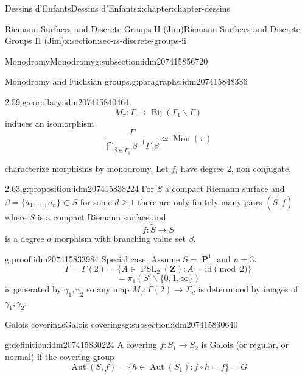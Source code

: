 \documentclass[oneside,10pt,]{book}
\numberwithin{equation}{section}
\newcommand{\inv}{^{-1}}
\newcommand{\ZZ}{\mathbf{Z}}
\newcommand{\id}{\mathrm{id}}
\DeclareMathOperator{\PP}{\mathbf{P}}
\DeclareMathOperator{\Aut}{Aut}
\DeclareMathOperator{\PSL}{PSL}
\begin{document}
\begin{chapterptx}{Dessins d'Enfants}{}{Dessins d'Enfants}{}{}{x:chapter:chapter-dessins}
\begin{sectionptx}{Riemann Surfaces and Discrete Groups II (Jim)}{}{Riemann Surfaces and Discrete Groups II (Jim)}{}{}{x:section:sec-rs-discrete-groups-ii}
\begin{subsectionptx}{Monodromy}{}{Monodromy}{}{}{g:subsection:idm207415856720}
\begin{paragraphs}{Monodromy and Fuchsian groups.}{g:paragraphs:idm207415848336}
\begin{corollary}{2.59.}{}{g:corollary:idm207415840464}%
%
\begin{equation*}
M_\pi \colon \Gamma \to \operatorname{Bij} (\Gamma_1 \backslash \Gamma)
\end{equation*}
induces an isomorphism%
\begin{equation*}
\frac{\Gamma}{\bigcap_{\beta\in \Gamma_1} \beta\inv \Gamma_1 \beta} \simeq \operatorname{Mon}(\pi)
\end{equation*}
%
\end{corollary}
characterize morphisms by monodromy. Let \(f_i\) have degree 2, non conjugate.%
\begin{proposition}{2.63.}{}{g:proposition:idm207415838224}%
For \(S\) a compact Riemann surface and \(\beta = \{ a_1, \ldots, a_n\} \subset S\) for some \(d \ge 1\) there are only finitely many pairs \((\tilde S, f)\) where \(\tilde S\) is a compact Riemann surface and%
\begin{equation*}
f\colon \tilde S \to S
\end{equation*}
is a degree \(d\) morphism with branching  value set \(\beta\).%
\end{proposition}
\begin{proofptx}{}{g:proof:idm207415833984}
Special case: Assume \(S = \PP^1\) and \(n=3\).%
\begin{equation*}
\Gamma = \Gamma(2) = \{ A \in \PSL_2(\ZZ) : A = \id \pmod 2\}
\end{equation*}
%
\begin{equation*}
= \pi_1 (S' \smallsetminus \{0,1,\infty\})
\end{equation*}
is generated by \(\gamma_1, \gamma_2\) so any map \(M_f \colon \Gamma(2) \to \Sigma_d\) is determined by  images of \(\gamma_1, \gamma_2\).%
\end{proofptx}
\end{paragraphs}%
\end{subsectionptx}
%
%
\typeout{************************************************}
\typeout{************************************************}
%
\begin{subsectionptx}{Galois coverings}{}{Galois coverings}{}{}{g:subsection:idm207415830640}
\begin{definition}{}{g:definition:idm207415830224}%
A covering \(f\colon S_1\to S_2\) is Galois (or regular, or normal) if the covering group%
\begin{equation*}
\Aut(S,f) =  \{ h\in \Aut(S_1) : f\circ h= f\} = G

\end{equation*}
\end{definition}
\end{subsectionptx}
\end{sectionptx}
\end{chapterptx}
\end{document}
